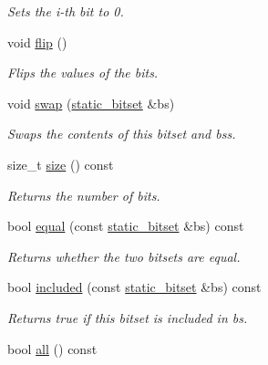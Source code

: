 \begin{DoxyCompactItemize}
\begin{DoxyCompactList}\small\item\em Sets the {\itshape i-\/th} bit to 0. \end{DoxyCompactList}\item 
void \hyperlink{classlgraph_1_1utils_1_1static__bitset_a430b19330c6f2a77f6ee15c3d652a2d6}{flip} ()
\begin{DoxyCompactList}\small\item\em Flips the values of the bits. \end{DoxyCompactList}\item 
void \hyperlink{classlgraph_1_1utils_1_1static__bitset_ae1737eb8f5aed69b6dd69c75334ef23a}{swap} (\hyperlink{classlgraph_1_1utils_1_1static__bitset}{static\+\_\+bitset} \&bs)
\begin{DoxyCompactList}\small\item\em Swaps the contents of this bitset and {\itshape bs\textquotesingle{}s}. \end{DoxyCompactList}\item 
size\+\_\+t \hyperlink{classlgraph_1_1utils_1_1static__bitset_a5e48518dc9d46c06338166c85f5f2cc3}{size} () const 
\begin{DoxyCompactList}\small\item\em Returns the number of bits. \end{DoxyCompactList}\item 
bool \hyperlink{classlgraph_1_1utils_1_1static__bitset_a071225c9851b9e3bbfdb778b9e20f303}{equal} (const \hyperlink{classlgraph_1_1utils_1_1static__bitset}{static\+\_\+bitset} \&bs) const 
\begin{DoxyCompactList}\small\item\em Returns whether the two bitsets are equal. \end{DoxyCompactList}\item 
bool \hyperlink{classlgraph_1_1utils_1_1static__bitset_a789f2ac0b02c7ecc2e18f6e7a5374869}{included} (const \hyperlink{classlgraph_1_1utils_1_1static__bitset}{static\+\_\+bitset} \&bs) const 
\begin{DoxyCompactList}\small\item\em Returns true if this bitset is included in {\itshape bs}. \end{DoxyCompactList}\item 
bool \hyperlink{classlgraph_1_1utils_1_1static__bitset_a7dd02f04251cc020b8f24085e2bc33d3}{all} () const \hypertarget{classlgraph_1_1utils_1_1static__bitset_a7dd02f04251cc020b8f24085e2bc33d3}{}\label{classlgraph_1_1utils_1_1static__bitset_a7dd02f04251cc020b8f24085e2bc33d3}


\end{DoxyCompactItemize}
